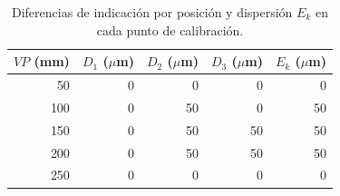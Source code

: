 \begin{table}[H]
\centering
\caption{Diferencias de indicación por posición y dispersión $E_k$ en cada punto de calibración.}
\label{tab:pie-rey-diferencias}
\begin{tabular}{rrrrr}
\toprule
$VP$ (mm) & $D_1$ ($\mu$m) & $D_2$ ($\mu$m) & $D_3$ ($\mu$m) & $E_k$ ($\mu$m) \\
\midrule
50 & 0 & 0 & 0 & 0 \\
100 & 0 & 50 & 0 & 50 \\
150 & 0 & 50 & 50 & 50 \\
200 & 0 & 50 & 50 & 50 \\
250 & 0 & 0 & 0 & 0 \\
\bottomrule
\end{tabular}
\end{table}
